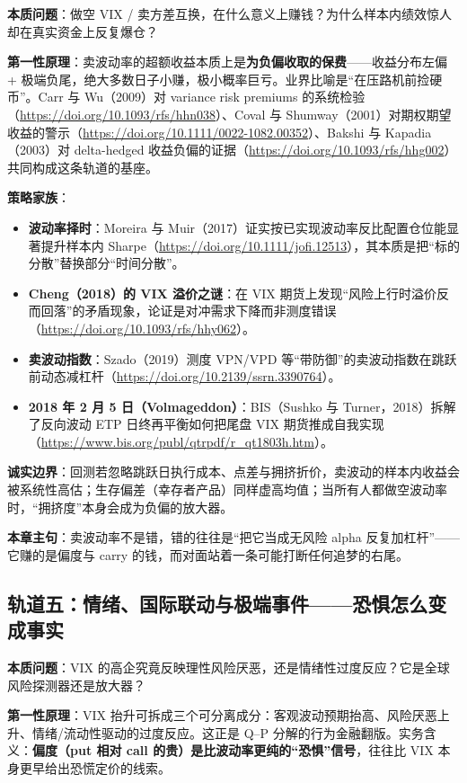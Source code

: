 \documentclass[11pt,a4paper]{article}
\begin{document}
\textbf{本质问题}：做空 VIX / 卖方差互换，在什么意义上赚钱？为什么样本内绩效惊人却在真实资金上反复爆仓？

\textbf{第一性原理}：卖波动率的超额收益本质上是\textbf{为负偏收取的保费}——收益分布左偏 + 极端负尾，绝大多数日子小赚，极小概率巨亏。业界比喻是“在压路机前捡硬币”。Carr 与 Wu（2009）对 variance risk premiums 的系统检验（\url{https://doi.org/10.1093/rfs/hhn038}）、Coval 与 Shumway（2001）对期权期望收益的警示（\url{https://doi.org/10.1111/0022-1082.00352}）、Bakshi 与 Kapadia（2003）对 delta-hedged 收益负偏的证据（\url{https://doi.org/10.1093/rfs/hhg002}）共同构成这条轨道的基座。

\textbf{策略家族}：
\begin{itemize}[leftmargin=2.2em]
  \item \textbf{波动率择时}：Moreira 与 Muir（2017）证实按已实现波动率反比配置仓位能显著提升样本内 Sharpe（\url{https://doi.org/10.1111/jofi.12513}），其本质是把“标的分散”替换部分“时间分散”。
  \item \textbf{Cheng（2018）的 VIX 溢价之谜}：在 VIX 期货上发现“风险上行时溢价反而回落”的矛盾现象，论证是对冲需求下降而非测度错误（\url{https://doi.org/10.1093/rfs/hhy062}）。
  \item \textbf{卖波动指数}：Szado（2019）测度 VPN/VPD 等“带防御”的卖波动指数在跳跃前动态减杠杆（\url{https://doi.org/10.2139/ssrn.3390764}）。
  \item \textbf{2018 年 2 月 5 日（Volmageddon）}：BIS（Sushko 与 Turner，2018）拆解了反向波动 ETP 日终再平衡如何把尾盘 VIX 期货推成自我实现（\url{https://www.bis.org/publ/qtrpdf/r_qt1803h.htm}）。
\end{itemize}

\textbf{诚实边界}：回测若忽略跳跃日执行成本、点差与拥挤折价，卖波动的样本内收益会被系统性高估；生存偏差（幸存者产品）同样虚高均值；当所有人都做空波动率时，“拥挤度”本身会成为负偏的放大器。

\textbf{本章主句}：卖波动率不是错，错的往往是“把它当成无风险 alpha 反复加杠杆”——它赚的是偏度与 carry 的钱，而对面站着一条可能打断任何追梦的右尾。

\subsection{轨道五：情绪、国际联动与极端事件——恐惧怎么变成事实}

\textbf{本质问题}：VIX 的高企究竟反映理性风险厌恶，还是情绪性过度反应？它是全球风险探测器还是放大器？

\textbf{第一性原理}：VIX 抬升可拆成三个可分离成分：客观波动预期抬高、风险厌恶上升、情绪/流动性驱动的过度反应。这正是 Q--P 分解的行为金融翻版。实务含义：\textbf{偏度（put 相对 call 的贵）是比波动率更纯的“恐惧”信号}，往往比 VIX 本身更早给出恐慌定价的线索。
\end{document}
